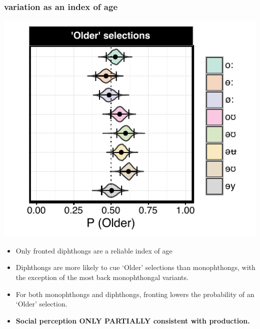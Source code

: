 \documentclass[a0,portrait]{a0poster}
\begin{document}
\begin{multicols*}{3}
\subsubsection*{ variation as an index of age}
\hspace*{-1cm}
\begin{minipage}{0.2\textwidth}
\includegraphics[scale=2.2]{ow_age_effects.pdf}
\end{minipage}
\hspace*{1.8cm}
\begin{minipage}{0.12\textwidth}
\raggedright
\begin{itemize}
\item{Only fronted diphthongs are a reliable index of age}
\item{Diphthongs are more likely to cue `Older' selections than monophthongs, with the exception of the most back monophthongal variants.}
\item{For both monophthongs and diphthongs, fronting lowers the probability of an `Older' selection.}
\end{itemize}
\end{minipage}
\vspace*{0.5cm}
\begin{itemize}
\item{\textbf{Social perception ONLY PARTIALLY consistent with production.}}
\end{itemize}

\end{multicols*}
\end{document}
